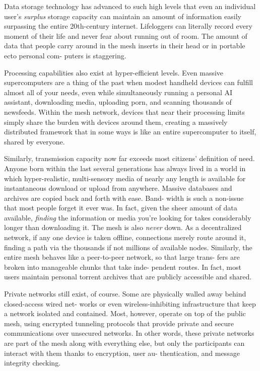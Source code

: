 Data storage technology has advanced to such high 
levels that even an individual user's \textit{surplus }storage 
capacity can maintain an amount of information 
easily surpassing the entire 20th-century internet. 
Lifeloggers can literally record every moment of their 
life and never fear about running out of room. The 
amount of data that people carry around in the mesh 
inserts in their head or in portable ecto personal com-
puters is staggering.

Processing capabilities also exist at hyper-efficient 
levels. Even massive supercomputers are a thing of the 
past when modest handheld devices can fulfill almost 
all of your needs, even while simultaneously running a 
personal AI assistant, downloading media, uploading 
porn, and scanning thousands of newsfeeds. Within 
the mesh network, devices that near their processing 
limits simply share the burden with devices around 
them, creating a massively distributed framework that 
in some ways is like an entire supercomputer to itself, 
shared by everyone.

Similarly, transmission capacity now far exceeds 
most citizens' definition of need. Anyone born within 
the last several generations has always lived in a world 
in which hyper-realistic, multi-sensory media of nearly 
any length is available for instantaneous download 
or upload from anywhere. Massive databases and 
archives are copied back and forth with ease. Band-
width is such a non-issue that most people forget it ever 
was. In fact, given the sheer amount of data available, 
\textit{finding }the information or media you're looking for 
takes considerably longer than downloading it. The 
mesh is also \textit{never }down. As a decentralized network, 
if any one device is taken offline, connections merely 
route around it, finding a path via the thousands if not 
millions of available nodes. Similarly, the entire mesh 
behaves like a peer-to-peer network, so that large trans-
fers are broken into manageable chunks that take inde-
pendent routes. In fact, most users maintain personal 
torrent archives that are publicly accessible and shared.

Private networks still exist, of course. Some are 
physically walled away behind closed-access wired net-
works or even wireless-inhibiting infrastructure that 
keep a network isolated and contained. Most, however, 
operate on top of the public mesh, using encrypted 
tunneling protocols that provide private and secure 
communications over unsecured networks. In other 
words, these private networks are part of the mesh 
along with everything else, but only the participants 
can interact with them thanks to encryption, user au-
thentication, and message integrity checking.

